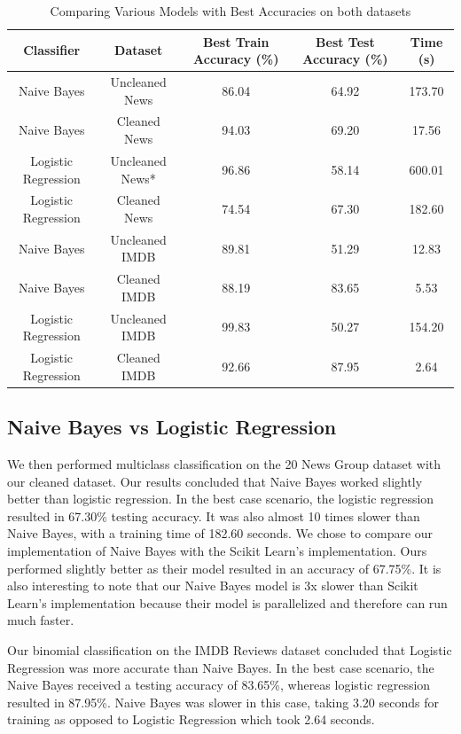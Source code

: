\documentclass{homework}
\begin{document}
\begin{table}[h!] 
\centering
\begin{tabular}{||c c c c c||} 
\hline
 Classifier & Dataset & Best Train Accuracy (\%) & Best Test Accuracy (\%) & Time (s)\\ [0.5ex]
 \hline\hline
 Naive Bayes & Uncleaned News & 86.04 & 64.92 & 173.70 \\ 
 Naive Bayes & Cleaned News & 94.03 & 69.20 & 17.56 \\ 
 Logistic Regression & Uncleaned News* &  96.86 & 58.14 & 600.01  \\
 Logistic Regression & Cleaned News & 74.54 & 67.30 & 182.60 \\
 \hline \hline
 Naive Bayes & Uncleaned IMDB & 89.81 & 51.29 & 12.83 \\ 
 Naive Bayes & Cleaned IMDB & 88.19 & 83.65 & 5.53 \\ 
 Logistic Regression & Uncleaned IMDB & 99.83 & 50.27 & 154.20 \\
 Logistic Regression & Cleaned IMDB & 92.66 & 87.95 & 2.64  \\[1ex] 
 \hline
\end{tabular}
\caption{Comparing Various Models with Best Accuracies on both datasets}
\label{table-cleaned-vs-uncleaned}
\end{table}

\subsection{Naive Bayes vs Logistic Regression}
We then performed multiclass classification on the 20 News Group dataset with our cleaned dataset. Our results concluded that Naive Bayes worked slightly better than logistic regression. In the best case scenario, the logistic regression resulted in 67.30\% testing accuracy. It was also almost 10 times slower than Naive Bayes, with a training time of 182.60 seconds. We chose to compare our implementation of Naive Bayes with the Scikit Learn's implementation. Ours performed slightly better as their model resulted in an accuracy of 67.75\%. It is also interesting to note that our Naive Bayes model is 3x slower than Scikit Learn's implementation because their model is parallelized and therefore can run much faster.

Our binomial classification on the IMDB Reviews dataset concluded that Logistic Regression was more accurate than Naive Bayes. In the best case scenario, the Naive Bayes received a testing accuracy of 83.65\%, whereas logistic regression resulted in 87.95\%. Naive Bayes was slower in this case, taking 3.20 seconds for training as opposed to Logistic Regression which took 2.64 seconds.
\end{document}
